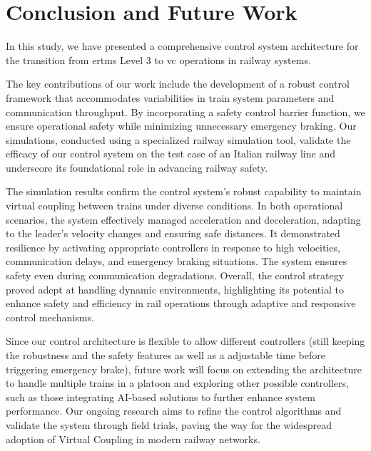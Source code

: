 \documentclass[letterpaper, 10 pt, conference]{ieeeconf}
\theoremstyle{definition}
\theoremstyle{nopoint}
\begin{document}
		
\section{Conclusion and Future Work}
\label{sec:conclusion}

In this study, we have presented a comprehensive control system architecture for the transition from \gls{ertms} Level 3 to \gls{vc} operations in railway systems. 

The key contributions of our work include the development of a robust control framework that accommodates variabilities in train system parameters and communication throughput. By incorporating a safety control barrier function, we ensure operational safety while minimizing unnecessary emergency braking. Our simulations, conducted using a specialized railway simulation tool, validate the efficacy of our control system on the test case of an Italian railway line and underscore its foundational role in advancing railway safety.

The simulation results confirm the control system's robust capability to maintain virtual coupling between trains under diverse conditions. In both operational scenarios, the system effectively managed acceleration and deceleration, adapting to the leader's velocity changes and ensuring safe distances. It demonstrated resilience by activating appropriate controllers in response to high velocities, communication delays, and emergency braking situations. The system ensures safety even during communication degradations. Overall, the control strategy proved adept at handling dynamic environments, highlighting its potential to enhance safety and efficiency in rail operations through adaptive and responsive control mechanisms.

Since our control architecture is flexible to allow different controllers (still keeping the robustness and the safety features as well as a adjustable time before triggering emergency brake), future work will focus on extending the architecture to handle multiple trains in a platoon and exploring other possible controllers, such as those  integrating AI-based solutions to further enhance system performance. Our ongoing research aims to refine the control algorithms and validate the system through field trials, paving the way for the widespread adoption of Virtual Coupling in modern railway networks.
\end{document}
